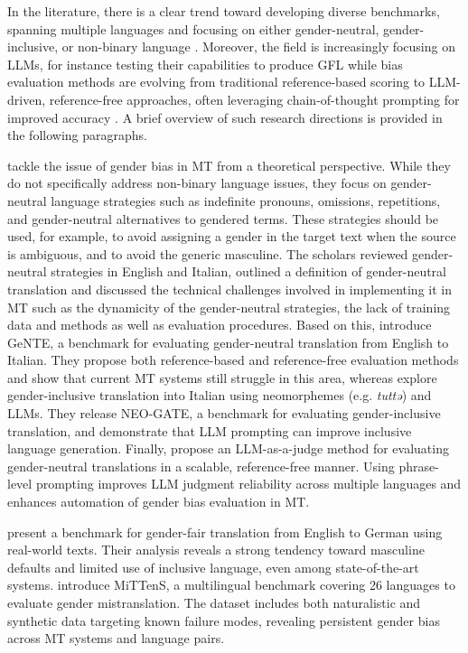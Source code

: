 In the literature, there is a clear trend toward developing diverse benchmarks, spanning multiple languages and focusing on either gender-neutral, gender-inclusive, or non-binary language \citep{piergentili-etal-2023-hi,piergentili-etal-2024-enhancing,lardelli-etal-2024-building}. Moreover, the field is increasingly focusing on LLMs, for instance testing their capabilities to produce GFL while bias evaluation methods are evolving from traditional reference-based scoring to LLM-driven, reference-free approaches, often leveraging chain-of-thought prompting for improved accuracy \citep{piergentili2025llm}. A brief overview of such research directions is provided in the following paragraphs.

\textcite{piergentili2023gender} tackle the issue of gender bias in MT from a theoretical perspective. While they do not specifically address non-binary language issues, they focus on gender-neutral language strategies such as indefinite pronouns, omissions, repetitions, and gender-neutral alternatives to gendered terms. These strategies should be used, for example, to avoid assigning a gender in the target text when the source is ambiguous, and to avoid the generic masculine. The scholars reviewed gender-neutral strategies in English and Italian, outlined a definition of gender-neutral translation and discussed the technical challenges involved in implementing it in MT such as the dynamicity of the gender-neutral strategies, the lack of training data and methods as well as evaluation procedures. Based on this, \textcite{piergentili-etal-2023-hi} introduce GeNTE, a benchmark for evaluating gender-neutral translation from English to Italian. They propose both reference-based and reference-free evaluation methods and show that current MT systems still struggle in this area, whereas \textcite{piergentili-etal-2024-enhancing} explore gender-inclusive translation into Italian using neomorphemes (e.g. \textit{tuttə}) and LLMs. They release NEO-GATE, a benchmark for evaluating gender-inclusive translation, and demonstrate that LLM prompting can improve inclusive language generation. Finally, \textcite{piergentili2025llm} propose an LLM-as-a-judge method for evaluating gender-neutral translations in a scalable, reference-free manner. Using phrase-level prompting improves LLM judgment reliability across multiple languages and enhances automation of gender bias evaluation in MT.

\textcite{lardelli-etal-2024-building} present a benchmark for gender-fair translation from English to German using real-world texts. Their analysis reveals a strong tendency toward masculine defaults and limited use of inclusive language, even among state-of-the-art systems. \textcite{robinson-etal-2024-mittens} introduce MiTTenS, a multilingual benchmark covering 26 languages to evaluate gender mistranslation. The dataset includes both naturalistic and synthetic data targeting known failure modes, revealing persistent gender bias across MT systems and language pairs.

